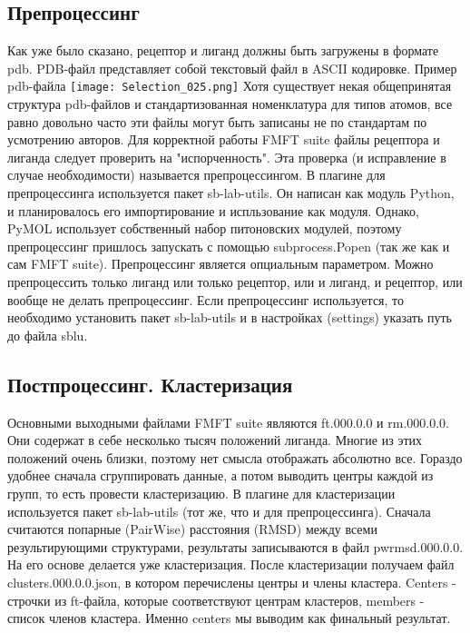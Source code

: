 \documentclass[a4paper,12pt]{article}
\numberwithin{equation}{section}%
\begin{document}
\subsection{Препроцессинг}\label{prep}
Как уже было сказано, рецептор и лиганд должны быть загружены в формате pdb. PDB-файл представляет собой текстовый файл в ASCII кодировке.
\newline
Пример pdb-файла
\newline
\texttt{[image: Selection\_025.png]}
\newline
\newline
Хотя существует некая общепринятая структура pdb-файлов и стандартизованная номенклатура для типов атомов, все равно довольно часто эти файлы могут быть записаны не по стандартам по усмотрению авторов. 
\newline
Для корректной работы FMFT suite файлы рецептора и лиганда следует проверить на "испорченность". Эта проверка (и исправление в случае необходимости) называется препроцессингом.
\newline
В плагине для препроцессинга используется пакет sb-lab-utils. Он написан как модуль Python, и планировалось его импортирование и испльзование как модуля. Однако, PyMOL использует собственный набор питоновских модулей, поэтому препроцессинг пришлось запускать с помощью subprocess.Popen (так же как и сам FMFT suite). 
\newline
Препроцессинг является опциальным параметром. Можно препроцессить только лиганд или только рецептор, или и лиганд, и рецептор, или вообще не делать препроцессинг.
\newline
Если препроцессинг используется, то необходимо установить пакет sb-lab-utils и в настройках (settings) указать путь до файла sblu.

\subsection{Постпроцессинг. Кластеризация}
Основными выходными файлами FMFT suite являются ft.000.0.0 и rm.000.0.0. Они содержат в себе несколько тысяч положений лиганда. Многие из этих положений очень близки, поэтому нет смысла отображать абсолютно все. Гораздо удобнее сначала сгруппировать данные, а потом выводить центры каждой из групп, то есть провести кластеризацию.
\newline
В плагине для кластеризации используется пакет sb-lab-utils (тот же, что и для препроцессинга). Сначала считаются попарные (PairWise) расстояния (RMSD) между всеми результирующими структурами, результаты записываются в файл pwrmsd.000.0.0. На его основе делается уже кластеризация. После кластеризации получаем файл clusters.000.0.0.json, в котором перечислены центры и члены кластера. Centers - строчки из ft-файла, которые соответствуют центрам кластеров, members - список членов кластера. Именно centers мы выводим как финальный результат.
\newpage
\end{document}

